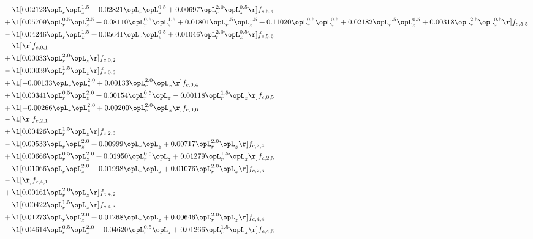 \begin{alignat}{2}
& - \l[  0.02123 \opL_r \opL_z^{1.5} +  0.02821 \opL_r \opL_z^{0.5} +  0.00697 \opL_r^{2.0} \opL_z^{0.5}  \r] f_{c,5,4} \nonumber \\ 
& + \l[  0.05709 \opL_r^{0.5} \opL_z^{2.5} +  0.08110 \opL_r^{0.5} \opL_z^{1.5} +  0.01801 \opL_r^{1.5} \opL_z^{1.5} +  0.11020 \opL_r^{0.5} \opL_z^{0.5} +  0.02182 \opL_r^{1.5} \opL_z^{0.5} +  0.00318 \opL_r^{2.5} \opL_z^{0.5}  \r] f_{c,5,5} \nonumber \\ 
& - \l[  0.04246 \opL_r \opL_z^{1.5} +  0.05641 \opL_r \opL_z^{0.5} +  0.01046 \opL_r^{2.0} \opL_z^{0.5}  \r] f_{c,5,6} \nonumber \\ 
& - \l[  \r] f_{c,0,1} \nonumber \\ 
& + \l[  0.00033 \opL_r^{2.0} \opL_z  \r] f_{c,0,2} \nonumber \\ 
& - \l[  0.00039 \opL_r^{1.5} \opL_z  \r] f_{c,0,3} \nonumber \\ 
& + \l[  -0.00133 \opL_r \opL_z^{2.0} +  0.00133 \opL_r^{2.0} \opL_z  \r] f_{c,0,4} \nonumber \\ 
& + \l[  0.00341 \opL_r^{0.5} \opL_z^{2.0} +  0.00154 \opL_r^{0.5} \opL_z   -0.00118 \opL_r^{1.5} \opL_z  \r] f_{c,0,5} \nonumber \\ 
& + \l[  -0.00266 \opL_r \opL_z^{2.0} +  0.00200 \opL_r^{2.0} \opL_z  \r] f_{c,0,6} \nonumber \\ 
& - \l[  \r] f_{c,2,1} \nonumber \\ 
& + \l[  0.00426 \opL_r^{1.5} \opL_z  \r] f_{c,2,3} \nonumber \\ 
& - \l[  0.00533 \opL_r \opL_z^{2.0} +  0.00999 \opL_r \opL_z +  0.00717 \opL_r^{2.0} \opL_z  \r] f_{c,2,4} \nonumber \\ 
& + \l[  0.00666 \opL_r^{0.5} \opL_z^{2.0} +  0.01950 \opL_r^{0.5} \opL_z +  0.01279 \opL_r^{1.5} \opL_z  \r] f_{c,2,5} \nonumber \\ 
& - \l[  0.01066 \opL_r \opL_z^{2.0} +  0.01998 \opL_r \opL_z +  0.01076 \opL_r^{2.0} \opL_z  \r] f_{c,2,6} \nonumber \\ 
& - \l[  \r] f_{c,4,1} \nonumber \\ 
& + \l[  0.00161 \opL_r^{2.0} \opL_z  \r] f_{c,4,2} \nonumber \\ 
& - \l[  0.00422 \opL_r^{1.5} \opL_z  \r] f_{c,4,3} \nonumber \\ 
& + \l[  0.01273 \opL_r \opL_z^{2.0} +  0.01268 \opL_r \opL_z +  0.00646 \opL_r^{2.0} \opL_z  \r] f_{c,4,4} \nonumber \\ 
& - \l[  0.04614 \opL_r^{0.5} \opL_z^{2.0} +  0.04620 \opL_r^{0.5} \opL_z +  0.01266 \opL_r^{1.5} \opL_z  \r] f_{c,4,5} \nonumber \\ 

\end{alignat}
